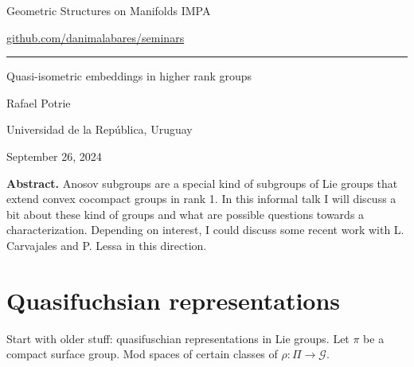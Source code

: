 



\begin{minipage}{\textwidth}
	\begin{minipage}{1\textwidth}
		Geometric Structures on Manifolds \hfill IMPA
		
		{\small\hfill\href{https://github.com/danimalabares/seminars}{github.com/danimalabares/seminars}}

		
	\end{minipage}
\end{minipage}\vspace{.2cm}\hrule

\vspace{10pt}

{\Huge  Quasi-isometric embeddings in higher rank groups}

\hfill{\Large Rafael Potrie}

{\Large \hfill Universidad de la República, Uruguay}

\hfill{\large September 26, 2024}

{\color{6}\bfseries Abstract.}\hspace{.5em} Anosov subgroups are a special kind of subgroups of Lie groups that extend convex cocompact groups in rank 1. In this informal talk I will discuss a bit about these kind of groups and what are possible questions towards a characterization. Depending on interest, I could discuss some recent work with L. Carvajales and P. Lessa in this direction.

\tableofcontents

\section{Quasifuchsian representations}

Start with older stuff: quasifuschian representations in Lie groups. Let $\pi$ be a compact surface group. Mod spaces of certain classes of $\rho:\Pi\longrightarrow \mathcal{G}$.

